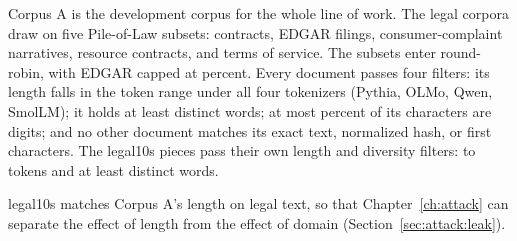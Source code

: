 Corpus A is the development corpus for the whole line of work. The legal corpora draw on five Pile-of-Law subsets: contracts, EDGAR filings, consumer-complaint narratives, resource contracts, and terms of service. The subsets enter round-robin, with EDGAR capped at  percent. Every document passes four filters: its length falls in the token range under all four tokenizers (Pythia, OLMo, Qwen, SmolLM); it holds at least  distinct words; at most  percent of its characters are digits; and no other document matches its exact text, normalized hash, or first  characters. The legal10s pieces pass their own length and diversity filters:  to  tokens and at least  distinct words. %

legal10s matches Corpus A's length on legal text, so that Chapter~\ref{ch:attack} can separate the effect of length from the effect of domain (Section~\ref{sec:attack:leak}).
